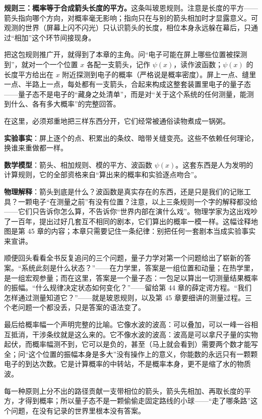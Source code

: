 \textbf{规则三：概率等于合成箭头长度的平方。}这条叫玻恩规则。注意是长度的平方——箭头指向哪个方向，对概率毫无影响；指向只在与别的箭头相加时才显露意义。可观测的世界（屏幕上闪不闪光）只认识箭头的长度，相位本身永远躲在幕后，只通过“相加”这个环节间接现身。

把这包规则推广开，就得到了本章的主角。问“电子可能在屏上哪些位置被探测到”，就对一个一个位置 \(x\) 各配一支箭头，记作 \(\psi(x)\)，读作波函数；\(\psi(x)\) 的长度平方给出在 \(x\) 附近探测到电子的概率（严格说是概率密度）。屏上一点、缝里一点、半路上一点，每处都有一支箭头，合起来构成这整套装置里电子的量子态——量子态不是电子的“藏身之处清单”，而是对“关于这个系统的任何测量，能测到什么、各有多大概率”的完整回答。

在这里，必须郑重地把三样东西分开，它们经常被通俗读物煮成一锅粥。

\textbf{实验事实}：屏上逐个的点、积累出的条纹、暗带关缝变亮。这些不依赖任何理论，换谁来重做都一样。

\textbf{数学模型}：箭头、相加规则、模的平方、波函数 \(\psi(x)\)。这套东西是人为发明的计算规则，它的全部资格来自“算出来的概率和实验逐点吻合”。

\textbf{物理解释}：箭头到底是什么？波函数是真实存在的东西，还是只是我们的记账工具？一颗电子“在测量之前”有没有位置？注意，以上三条规则一个字的解释都没给——它们只告诉你怎么算，不告诉你“世界内部在演什么戏”。物理学家为这出戏吵了一百年，提出过好几套互不相同的剧本，它们算出的概率一模一样。这幅诠释地图是第 45 章的内容；本章只需要记住一条纪律：别把任何一套剧本当成实验事实来宣讲。

顺便回头看看全书反复追问的三个问题，量子力学对第一个问题给出了崭新的答案。“系统此刻是什么状态？”——在力学里，答案是一组位置和动量；在热学里，是一组宏观参量；而在这里，答案是一个量子态：一包足以算出一切测量结果概率的振幅。“什么规律决定状态如何变化？”——留给第 44 章的薛定谔方程。“我们怎样通过测量知道它？”——就是玻恩规则，以及第 45 章要细讲的测量过程。三个老问题一个都没丢，只是答案的语法变了。

最后给概率幅一个声明完整的比喻。它像水波的波高：可以叠加，可以一峰一谷相互抵消，干涉条纹就是这么来的。它不像水波的波高：波高是可以拿尺子量的实物起伏，而概率幅测不到，它可以是负的，甚至（马上就会看到）需要两个数才能写全；问“这个位置的振幅本身是多大”没有操作上的意义，你能数的永远只有一颗颗电子的到达次数。它是计算概率的中转站，不是概率本身，更不是缩了水的物质波。


\begin{oneline}
每一种原则上分不出的路径贡献一支带相位的箭头，箭头先相加、再取长度的平方，才得到概率；所以量子态不是一颗偷偷走固定路线的小球——“走了哪条路”这个问题，在没有记录的世界里根本没有答案。
\end{oneline}

